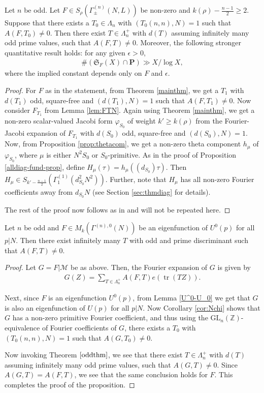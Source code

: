 \documentclass[11pt]{amsart}
\numberwithin{equation}{section}
\newcommand{\mbb}{\mathbb}
\newcommand{\mc}{\mathcal}
\newcommand{\mf}{\mathbf}
\newcommand{\mk}{\mathfrak}
\newcommand{\mrm}{\mathrm} %
\DeclareMathOperator{\tr}{tr}
\newcommand{\glnz}{\mrm{GL}_n( \mbb Z)}
\newcommand{\sumn}{\sum \nolimits}
\begin{document}
\begin{theorem} \label{oddthm}
Let $n$ be odd. Let $F \in S_\rho(\Gamma_{\pm}^{(n)}(N, L))$ be non-zero and $k(\rho) - \frac{n-1}{2} \ge 2 $. Suppose that there exists a $T_0\in \Lambda_n$ with $(T_0(n,n), N)=1$ such that $A(F,T_0)\neq 0$.  Then there exist $T \in \Lambda_n^+$ with $d(T)$ assuming infinitely many odd prime values, such that $A(F, T)\neq 0$. Moreover, the following stronger quantitative result holds: for any given $\epsilon>0$,
\begin{align*}
\# \left( {\mk S}_F (X) \cap \mf P \right) \gg X/\log X,
\end{align*}
where the implied constant depends only on $F$ and $\epsilon$.
\end{theorem}
\begin{proof}
For $F$ as in the statement, from Theorem \ref{mainthm}, we get a $T_1$ with $d(T_1)$ odd, square-free and $(d(T_1), N)=1$ such that $A(F, T_1)\neq 0$. Now consider $F_{T_1}$ from Lemma \ref{lem:FTN}. Again using Theorem \ref{mainthm},  we get a non-zero scalar-valued Jacobi form $\varphi_{S_0}$ of weight $k'\ge k(\rho)$ from the Fourier-Jacobi expansion of $F_{T_1}$ with $d(S_0)$ odd, square-free and $(d(S_0), N)=1$. Now, from Proposition \ref{prop:thetacom}, we get a non-zero theta component $h_\mu$ of $\varphi_{S_0}$, where $\mu$ is either $N^2S_0$ or $S_0$-primitive. As in the proof of Proposition \ref{alldiag-fund-prop}, define $H_\mu(\tau)= h_\mu((d_{S_0})\tau)$. Then $H_\mu \in S_{k'-\frac{n-1}{2}}(\Gamma_1^{(1)}(d_{S_0}^2 N^2))$. Further,  note that $H_\mu$ has all non-zero Fourier coefficients away from $d_{S_0}N$ (see Section \ref{sec:thmdiag} for details).

The rest of the proof now follows as in \cite[Theorem~5.1]{boche-das} and will not be repeated here.
\end{proof}
\begin{proposition}\label{prop:FU^0-prime}
    Let $n$ be odd and  $F\in M_k(\Gamma^{(n),0}(N)) $ be an eigenfunction of $U^0(p)$ for all $p|N$. Then there exist infinitely many $T$ with odd and prime discriminant such that $A(F, T)\neq 0$.
\end{proposition}
\begin{proof}
Let $G=F|\mc M$ be as above. Then, the Fourier expansion of $G$ is given by
    \begin{align}
        G(Z)= \sumn_{T\in \Lambda_n^+}A(F,T)e(\tr(TZ)).
    \end{align}

Next, since $F$ is an eigenfunction $U^0(p)$, from Lemma \ref{U^0-U_0} we get that $G$ is also an eigenfunction of $U(p)$ for all $p|N$. Now Corollary \ref{cor:Nchi} shows that $G$ has a non-zero primitive Fourier coefficient, and thus using the $\glnz$-equivalence of Fourier coefficients of $G$, there exists a $T_0$ with $(T_0(n,n), N)=1$ such that $A(G, T_0)\neq 0$.

Now invoking Theorem $\ref{oddthm}$, we see that there exist $T \in \Lambda_n^+$ with $d(T)$ assuming infinitely many odd prime values, such that $A(G, T)\neq 0$. Since $A(G, T)=A(F,T)$, we see that the same conclusion holds for $F$. This completes the proof of the proposition.
\end{proof}
\end{document}
